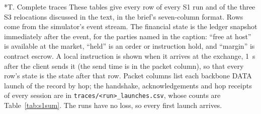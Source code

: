 \documentclass[10pt,letterpaper]{article}
\makeatletter
\renewcommand\section{\@startsection{section}{1}{\z@}{-9pt plus -2pt minus -1pt}{3pt}{\normalfont\large\bfseries}}
\makeatother
\begin{document}
\clearpage
\section*{T. Complete traces}
These tables give every row of every S1 run and of the three S3 relocations discussed in the text, in the brief's
seven-column format. Rows come from the simulator's event stream. The financial state is the ledger snapshot
immediately after the event, for the parties named in the caption: ``free at host'' is available at the market,
``held'' is an order or instruction hold, and ``margin'' is contract escrow. A local instruction is shown when it
arrives at the exchange, 1~s after the client sends it (the send time is in the packet column), so that every row's
state is the state after that row. Packet columns list each backbone DATA launch of the record by hop; the
handshake, acknowledgements and hop receipts of every session are in \texttt{traces/<run>\_launches.csv}, whose
counts are Table~\ref{tab:s1sum}. The runs have no loss, so every first launch arrives.
\end{document}
